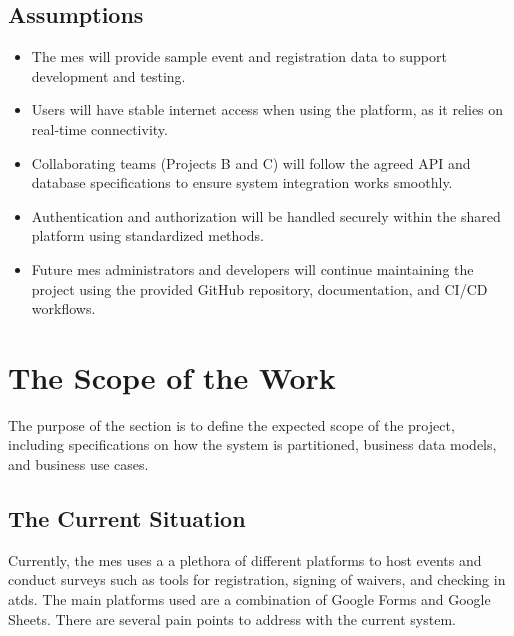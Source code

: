 \documentclass[12pt]{article}
\begin{document}
\subsection{Assumptions}

\begin{itemize}
    \item The \gls{mes} will provide sample event and registration data to support development and testing.
    \item Users will have stable internet access when using the platform, as it relies on real-time connectivity.
    \item Collaborating teams (Projects B and C) will follow the agreed API and database specifications to ensure system
      integration works smoothly.
    \item Authentication and authorization will be handled securely within the shared platform using standardized
      methods.
    \item Future \gls{mes} administrators and developers will continue maintaining the project using the provided GitHub
      repository, documentation, and CI/CD workflows.
\end{itemize}

\section{The Scope of the Work}

The purpose of the section is to define the expected scope of the project, including specifications on how the system is
partitioned, business data models, and business use cases.

\subsection{The Current Situation}

Currently, the \gls{mes} uses a a plethora of different platforms to host events and conduct surveys such as tools for
registration, signing of waivers, and checking in \glspl{atd}. The main platforms used are a combination of Google Forms
and Google Sheets. There are several pain points to address with the current system.
\end{document}
